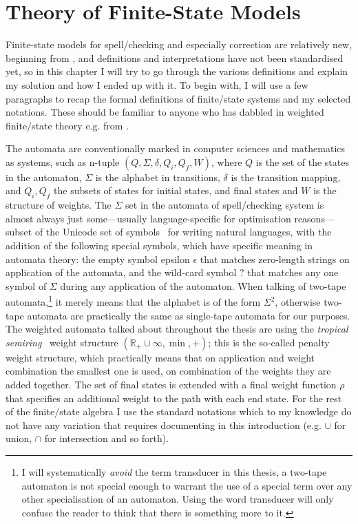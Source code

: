 \documentclass[officiallayout]{unihelcompling}
\begin{document}
\section{Theory of Finite-State Models}
\label{sec:finite-state-theory}

Finite-state models for spell\-/checking and especially correction are relatively
new, beginning from \citep{oflazer1996errortolerant}, and
definitions and interpretations have not been standardised yet, so in this
chapter I will try to go through the various definitions and explain my
solution and how I ended up with it. To begin with, I will use a few paragraphs
to recap the formal definitions of finite\-/state systems and my selected
notations. These should be familiar to anyone who has dabbled in weighted
finite\-/state theory e.g. from \citet{aho2007compilers,mohri1997finitestate}.

The automata are conventionally marked in computer sciences and mathematics as
systems, such as n-tuple $(Q, \Sigma, \delta, Q_i, Q_f, W)$, where $Q$ is the
set of the states in the automaton, $\Sigma$ is the alphabet in transitions,
$\delta$ is the transition mapping, and $Q_i, Q_f$ the subsets of states for
initial states, and final states and $W$ is the structure of weights. The
$\Sigma$ set in the automata of spell\-/checking system is almost always just
some---usually language-specific for optimisation reasons---subset of the
Unicode set of symbols~\citep{unicode} for writing natural languages, with the
addition of the following special symbols, which have specific meaning in
automata theory: the empty symbol epsilon $\epsilon$ that matches zero-length
strings on application of the automata, and the wild-card symbol $?$ that
matches any one symbol of $\Sigma$ during any application of the automaton.
When talking of two-tape automata,\footnote{I will systematically \emph{avoid}
    the term transducer in this thesis, a two-tape automaton is not special
enough to warrant the use of a special term over any other specialisation of an
automaton. Using the word transducer will only confuse the reader to think that
there is something more to it.} it merely means that the alphabet is of the
form $\Sigma^2$, otherwise two-tape automata are practically the same as
single-tape automata for our purposes. The weighted automata talked about
throughout the thesis are using the \emph{tropical
semiring}~\cite{mohri1997finitestate} weight structure $(\mathbb{R}_+ \cup
\infty, \min, +)$; this is the so-called penalty weight structure, which
practically means that on application and weight combination the smallest one
is used, on combination of the weights they are added together. The set of
final states is extended with a final weight function $\rho$ that specifies an
additional weight to the path with each end state. For the rest of the
finite\-/state algebra I use the standard notations which to my knowledge do
not have any variation that requires documenting in this introduction (e.g.
$\cup$ for union, $\cap$ for intersection and so forth).
\end{document}
